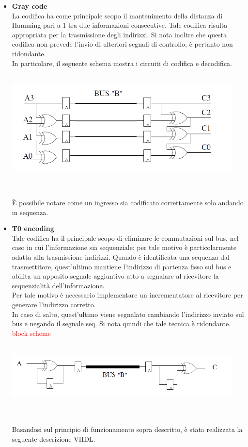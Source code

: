 \documentclass[11pt,  english, makeidx, a4paper, titlepage, oneside]{book}
\newenvironment{listato}{\footnotesize} {\normalsize }
\begin{document}
\begin{itemize}
\\\\
\item \textbf{Gray code}
\\
La codifica ha come principale scopo il mantenimento della distanza di Hamming pari a 1 tra due informazioni consecutive. Tale codifica risulta appropriata per la trasmissione degli indirizzi. Si nota inoltre che questa codifica non prevede l'invio di ulteriori segnali di controllo, è pertanto non ridondante.
\\
In particolare, il seguente schema mostra i circuiti di codifica e decodifica.
\\\\
\centerline{\includegraphics[width=12cm]{./img/Lab_4/gray.png}}
\\\\
È possibile notare come un ingresso sia codificato correttamente solo andando in sequenza.
\item \textbf{T0 encoding}
\\
Tale codifica ha il principale scopo di eliminare le commutazioni sul bus, nel caso in cui l'informazione sia sequenziale: per tale motivo è particolarmente adatta alla trasmissione indirizzi. Quando è identificata una sequenza dal trasmettitore, quest'ultimo mantiene l'indirizzo di partenza fisso sul bus e abilita un apposito segnale aggiuntivo atto a segnalare al ricevitore la sequenzialità dell'informazione.
\\
Per tale motivo è necessario implementare un incrementatore al ricevitore per generare l'indirizzo corretto.
\\
In caso di salto, quest'ultimo viene segnalato cambiando l'indirizzo inviato sul bus e negando il segnale seq.
Si nota quindi che tale tecnica è ridondante.
\\
\textcolor{red}{block scheme}
\\\\
\centerline{\includegraphics[width=12cm]{./img/Lab_4/tran_based.png}}
\\\\
Basandosi sul principio di funzionamento sopra descritto, è stata realizzata la seguente descrizione VHDL.
\begin{center}
\begin{listato}
	\centerline{}
\end{listato}
\end{center}
\end{itemize}
\end{document}
